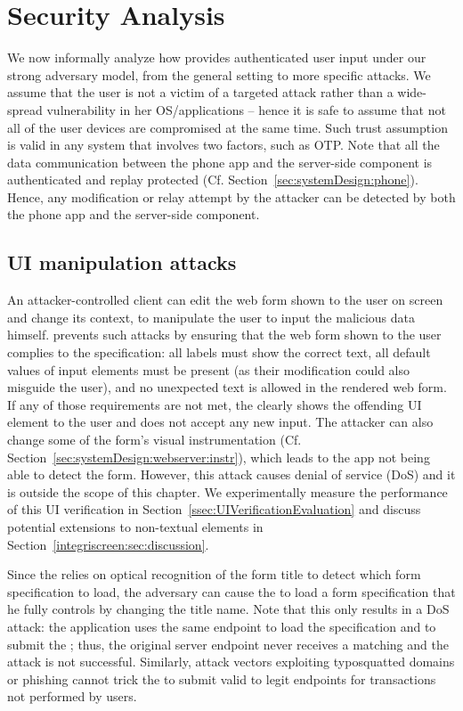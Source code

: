 \section{Security Analysis} 
\label{integriscreen:sec:securityAnalysis}


We now informally analyze how \sysname provides authenticated user input under our strong adversary model, from the general setting to more specific attacks.
We assume that the user is not a victim of a targeted attack rather than a wide-spread vulnerability in her OS/applications -- hence it is safe to assume that not all of the user devices are compromised at the same time. Such trust assumption is valid in any system that involves two factors, such as OTP. Note that all the data communication between the \sysname phone app and the server-side component is authenticated and replay protected (Cf. Section~\ref{sec:systemDesign:phone}). Hence, any modification or relay attempt by the attacker can be detected by both the phone app and the server-side component.


\subsection{UI manipulation attacks}

An attacker-controlled client can edit the web form shown to the user on screen and change its context, to manipulate the user to input the malicious data himself. \name prevents such attacks by ensuring that the web form shown to the user complies to the specification: all labels must show the correct text, all default values of input elements must be present (as their modification could also misguide the user), and no unexpected text is allowed in the rendered web form. If any of those requirements are not met, the \app clearly shows the offending UI element to the user and does not accept any new input. The attacker can also change some of the form's visual instrumentation (Cf. Section~\ref{sec:systemDesign:webserver:instr}), which leads to the \sysname app not being able to detect the form. However, this attack causes denial of service (DoS) and it is outside the scope of this chapter.
We experimentally measure the performance of this UI verification in Section~\ref{ssec:UIVerificationEvaluation} and discuss potential extensions to non-textual elements in Section~\ref{integriscreen:sec:discussion}.


Since the \app relies on optical recognition of the form title to detect which form specification to load, the adversary can cause the \app to load a form specification that he fully controls by changing the title name.
Note that this only results in a DoS attack: the application uses the same endpoint to load the specification and to submit the \POI; thus, the original server endpoint never receives a matching \POI and the attack is not successful.
Similarly, attack vectors exploiting typosquatted domains or phishing cannot trick the \app to submit valid \PsOI to legit endpoints for transactions not performed by users.


